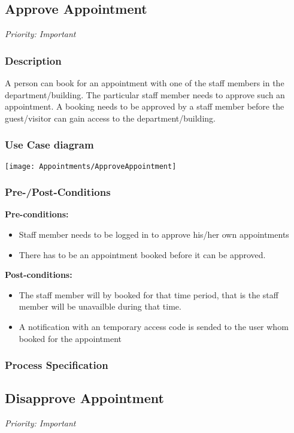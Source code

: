 \subsection{Approve Appointment}
\textit{Priority: Important} \\

\subsubsection{Description}
A person can book for an appointment with one of the staff members in the department/building. The particular staff member needs to approve such an appointment. A booking needs to be approved by a staff member before the guest/visitor can gain access to the department/building.

\subsubsection{Use Case diagram}
\texttt{[image: Appointments/ApproveAppointment]}

\subsubsection{Pre-/Post-Conditions}
\textbf{Pre-conditions:} 
	\begin{itemize}
		\item Staff member needs to be logged in to approve his/her own appointments
		\item There has to be an appointment booked before it can be approved.
	\end{itemize}
\textbf{ Post-conditions:} 
	\begin{itemize}
		\item The staff member will by booked for that time period, that is the staff member will be unavailble during that time.
		\item A notification with an temporary access code is sended to the user whom booked for the appointment
	\end{itemize}
	
\subsubsection{Process Specification}

\subsection{Disapprove Appointment}
\textit{Priority: Important} \\

